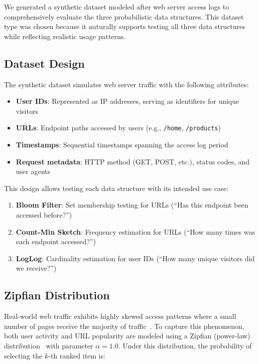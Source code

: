 We generated a synthetic dataset modeled after web server access logs to comprehensively evaluate the three probabilistic data structures. This dataset type was chosen because it naturally supports testing all three data structures while reflecting realistic usage patterns.

\subsection{Dataset Design}

The synthetic dataset simulates web server traffic with the following attributes:

\begin{itemize}
    \item \textbf{User IDs}: Represented as IP addresses, serving as identifiers for unique visitors
    \item \textbf{URLs}: Endpoint paths accessed by users (e.g., \texttt{/home}, \texttt{/products})
    \item \textbf{Timestamps}: Sequential timestamps spanning the access log period
    \item \textbf{Request metadata}: HTTP method (GET, POST, etc.), status codes, and user agents
\end{itemize}

This design allows testing each data structure with its intended use case:

\begin{enumerate}
    \item \textbf{Bloom Filter}: Set membership testing for URLs (``Has this endpoint been accessed before?'')
    \item \textbf{Count-Min Sketch}: Frequency estimation for URLs (``How many times was each endpoint accessed?'')
    \item \textbf{LogLog}: Cardinality estimation for user IDs (``How many unique visitors did we receive?'')
\end{enumerate}

\subsection{Zipfian Distribution}

Real-world web traffic exhibits highly skewed access patterns where a small number of pages receive the majority of traffic~\cite{broder2004network,breslau1999web}. To capture this phenomenon, both user activity and URL popularity are modeled using a Zipfian (power-law) distribution~\cite{breslau1999web} with parameter $\alpha = 1.0$. Under this distribution, the probability of selecting the $k$-th ranked item is:


